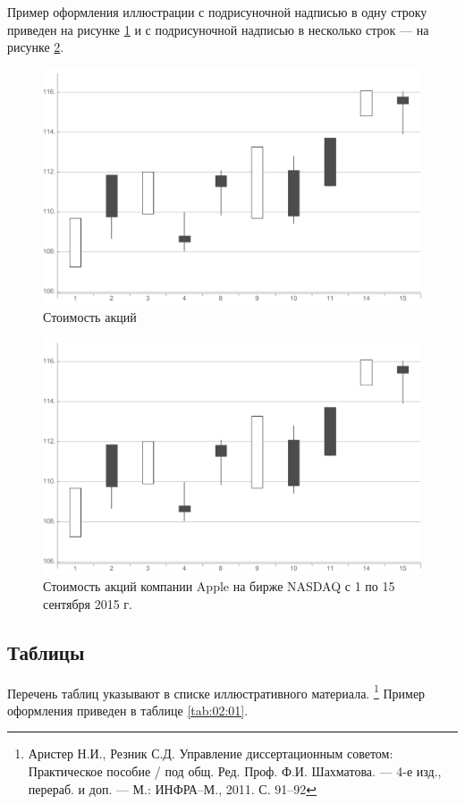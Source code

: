 \documentclass[12pt,a4paper, oneside]{extreport}
\begin{document}
Пример оформления иллюстрации с подрисуночной надписью в одну строку приведен на рисунке \ref{ris:02:01}  и с подрисуночной надписью в несколько строк --- на рисунке \ref{ris:02:02}.

\begin{figure}[H]
  \centering
    \includegraphics [width=0.5\linewidth]{Ris-01}
  \caption{Стоимость акций }\label{ris:02:01}
\end{figure}

\begin{figure}[H]
  \centering
    \includegraphics [width=0.5\linewidth]{Ris-01}
  \caption{Стоимость акций компании Apple на бирже NASDAQ с 1 по 15 сентября 2015 г.}\label{ris:02:02}
\end{figure}


\subsection{Таблицы}


Перечень таблиц указывают в списке иллюстративного материала. \footnote{Аристер Н.И., Резник С.Д. Управление диссертационным советом: Практическое пособие / под общ. Ред. Проф. Ф.И. Шахматова. --- 4-е изд., перераб. и доп. --- М.: ИНФРА–М., 2011. С. 91–92} Пример оформления приведен в таблице \ref{tab:02:01}.
\end{document}

